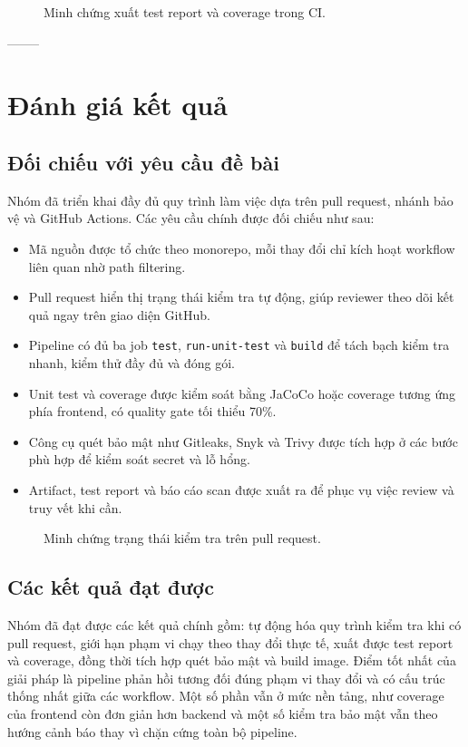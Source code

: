 \begin{figure}[H]
	\centering
	\caption{Minh chứng xuất test report và coverage trong CI.}
\end{figure}



--------

\section{Đánh giá kết quả}

\subsection{Đối chiếu với yêu cầu đề bài}
Nhóm đã triển khai đầy đủ quy trình làm việc dựa trên pull request, nhánh bảo vệ và GitHub Actions. Các yêu cầu chính được đối chiếu như sau:

\begin{itemize}
	\item Mã nguồn được tổ chức theo monorepo, mỗi thay đổi chỉ kích hoạt workflow liên quan nhờ path filtering.
	\item Pull request hiển thị trạng thái kiểm tra tự động, giúp reviewer theo dõi kết quả ngay trên giao diện GitHub.
	\item Pipeline có đủ ba job \texttt{test}, \texttt{run-unit-test} và \texttt{build} để tách bạch kiểm tra nhanh, kiểm thử đầy đủ và đóng gói.
	\item Unit test và coverage được kiểm soát bằng JaCoCo hoặc coverage tương ứng phía frontend, có quality gate tối thiểu 70\%.
	\item Công cụ quét bảo mật như Gitleaks, Snyk và Trivy được tích hợp ở các bước phù hợp để kiểm soát secret và lỗ hổng.
	\item Artifact, test report và báo cáo scan được xuất ra để phục vụ việc review và truy vết khi cần.
\end{itemize}

\begin{figure}[H]
	\centering
	\caption{Minh chứng trạng thái kiểm tra trên pull request.}
\end{figure}

\subsection{Các kết quả đạt được}
Nhóm đã đạt được các kết quả chính gồm: tự động hóa quy trình kiểm tra khi có pull request, giới hạn phạm vi chạy theo thay đổi thực tế, xuất được test report và coverage, đồng thời tích hợp quét bảo mật và build image. Điểm tốt nhất của giải pháp là pipeline phản hồi tương đối đúng phạm vi thay đổi và có cấu trúc thống nhất giữa các workflow. Một số phần vẫn ở mức nền tảng, như coverage của frontend còn đơn giản hơn backend và một số kiểm tra bảo mật vẫn theo hướng cảnh báo thay vì chặn cứng toàn bộ pipeline.

